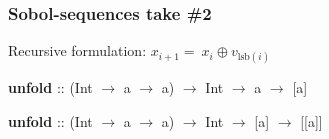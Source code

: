 \documentclass{beamer}
\begin{document}
\begin{frame}[fragile]
  \frametitle{Sobol-sequences take \#2}


Recursive formulation:
$x_{i+1}=~x_i\oplus v_{\mathrm{lsb}(i)}$




\vspace{5mm}

\textbf{unfold} :: (Int $\rightarrow$ a $\rightarrow$ a) $\rightarrow$ Int $\rightarrow$ a $\rightarrow$ [a]


\pause
\vspace{5mm}

\textbf{unfold} :: (Int $\rightarrow$ a $\rightarrow$ a) $\rightarrow$ Int $\rightarrow$  [a] $\rightarrow$ [[a]]




\end{frame}
\end{document}
